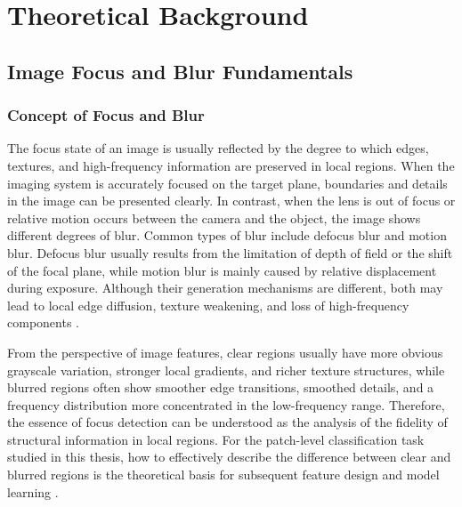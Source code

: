 \section{Theoretical Background}
\subsection{Image Focus and Blur Fundamentals}
\subsubsection{Concept of Focus and Blur}
\par The focus state of an image is usually reflected by the degree to which
edges, textures, and high-frequency information are preserved in local regions.
When the imaging system is accurately focused on the target plane, boundaries
and details in the image can be presented clearly. In contrast, when the lens is
out of focus or relative motion occurs between the camera and the object, the
image shows different degrees of blur. Common types of blur include defocus blur
and motion blur. Defocus blur usually results from the limitation of depth of
field or the shift of the focal plane, while motion blur is mainly caused by
relative displacement during exposure. Although their generation mechanisms are
different, both may lead to local edge diffusion, texture weakening, and loss of
high-frequency components
\cite{yi2016lbp,fergus2006removing}.

\par From the perspective of image features, clear regions usually have more
obvious grayscale variation, stronger local gradients, and richer texture
structures, while blurred regions often show smoother edge transitions, smoothed
details, and a frequency distribution more concentrated in the low-frequency
range. Therefore, the essence of focus detection can be understood as the
analysis of the fidelity of structural information in local regions. For the
patch-level classification task studied in this thesis, how to effectively
describe the difference between clear and blurred regions is the theoretical
basis for subsequent feature design and model learning
\cite{pertuz2013analysis,5739529}.
